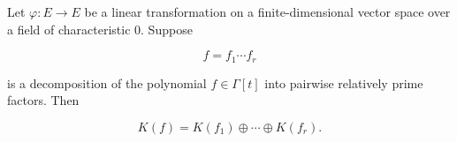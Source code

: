 Let $\varphi: E \to E$ be a linear transformation on a finite-dimensional vector space over a field of characteristic $0$. Suppose

$$f = f_1 \cdots f_r$$

is a decomposition of the polynomial $f \in \Gamma[t]$ into pairwise relatively prime factors. Then

$$K(f) = K(f_1) \oplus \cdots \oplus K(f_r).$$
